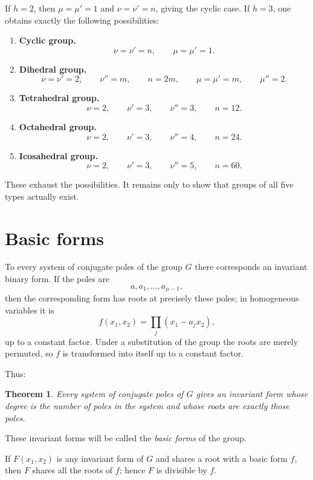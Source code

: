 \documentclass[11pt,a4paper]{book}
\newtheorem*{theorem*}{Theorem}
\begin{document}
If $h=2$, then $\mu=\mu'=1$ and $\nu=\nu'=n$, giving the cyclic case.  If $h=3$, one obtains exactly the following possibilities:

\begin{enumerate}[label=\Roman*.]
\item \textbf{Cyclic group.}
\[
 \nu=\nu'=n,
 \qquad \mu=\mu'=1.
\]
\item \textbf{Dihedral group.}
\[
 \nu=\nu'=2,
 \qquad \nu''=m,
 \qquad n=2m,
 \qquad \mu=\mu'=m,
 \qquad \mu''=2.
\]
\item \textbf{Tetrahedral group.}
\[
 \nu=2,
 \qquad \nu'=3,
 \qquad \nu''=3,
 \qquad n=12.
\]
\item \textbf{Octahedral group.}
\[
 \nu=2,
 \qquad \nu'=3,
 \qquad \nu''=4,
 \qquad n=24.
\]
\item \textbf{Icosahedral group.}
\[
 \nu=2,
 \qquad \nu'=3,
 \qquad \nu''=5,
 \qquad n=60.
\]
\end{enumerate}

These exhaust the possibilities.  It remains only to show that groups of all five types actually exist.

\section{Basic forms}

To every system of conjugate poles of the group $G$ there corresponds an invariant binary form.  If the poles are
\[
 a,a_1,\ldots,a_{\mu-1},
\]
then the corresponding form has roots at precisely these poles; in homogeneous variables it is
\begin{equation}\label{eq:w9-basic-form}
 f(x_1,x_2)=\prod_j(x_1-a_jx_2),
\end{equation}
up to a constant factor.  Under a substitution of the group the roots are merely permuted, so $f$ is transformed into itself up to a constant factor.

Thus:

\begin{theorem*}
Every system of conjugate poles of $G$ gives an invariant form whose degree is the number of poles in the system and whose roots are exactly those poles.
\end{theorem*}

These invariant forms will be called the \emph{basic forms} of the group.

If $F(x_1,x_2)$ is any invariant form of $G$ and shares a root with a basic form $f$, then $F$ shares all the roots of $f$; hence $F$ is divisible by $f$.
\end{document}
